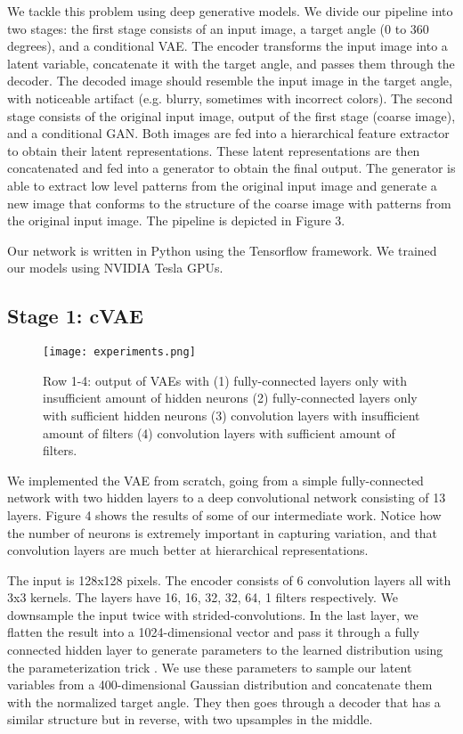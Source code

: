 \documentclass[10pt,conference]{IEEEtran}
\begin{document}
We tackle this problem using deep generative models. We divide our pipeline into two stages: the first stage consists of an input image, a target angle (0 to 360 degrees), and a conditional VAE. The encoder transforms the input image into a latent variable, concatenate it with the target angle, and passes them through the decoder. The decoded image should resemble the input image in the target angle, with noticeable artifact (e.g. blurry, sometimes with incorrect colors). The second stage consists of the original input image, output of the first stage (coarse image), and a conditional GAN. Both images are fed into a hierarchical feature extractor to obtain their latent representations. These latent representations are then concatenated and fed into a generator to obtain the final output. The generator is able to extract low level patterns from the original input image and generate a new image that conforms to the structure of the coarse image with patterns from the original input image. The pipeline is depicted in Figure 3.

Our network is written in Python using the Tensorflow framework. We trained our models using NVIDIA Tesla GPUs.


\subsection{Stage 1: cVAE}

\begin{figure}[htbp]
\centering
\texttt{[image: experiments.png]}
\caption{Row 1-4: output of VAEs with (1) fully-connected layers only with insufficient amount of  hidden neurons (2) fully-connected layers only with sufficient hidden neurons (3) convolution layers with insufficient amount of filters (4) convolution layers with sufficient amount of filters. }
\end{figure}

We implemented the VAE from scratch, going from a simple fully-connected network with two hidden layers to a deep convolutional network consisting of 13 layers. Figure 4 shows the results of some of our intermediate work. Notice how the number of neurons is extremely important in capturing variation, and that convolution layers are much better at hierarchical representations.

The input is 128x128 pixels. The encoder consists of 6 convolution layers all with 3x3 kernels. The layers have 16, 16, 32, 32, 64, 1 filters respectively. We downsample the input twice with strided-convolutions. In the last layer, we flatten the result into a 1024-dimensional vector and pass it through a fully connected hidden layer to generate parameters to the learned distribution using the parameterization trick \autocite{kingma2013auto}. We use these parameters to sample our latent variables from a 400-dimensional Gaussian distribution and concatenate them with the normalized target angle. They then goes through a decoder that has a similar structure but in reverse, with two upsamples in the middle.
\end{document}
